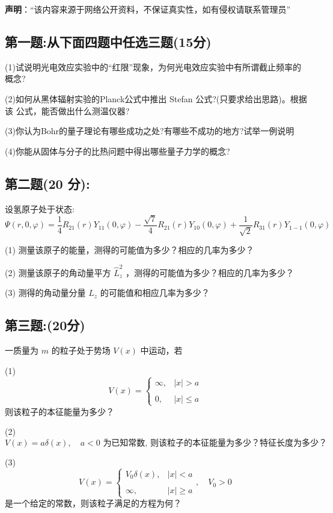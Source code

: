 
\textbf{声明}：“该内容来源于网络公开资料，不保证真实性，如有侵权请联系管理员”

\subsection{第一题:从下面四题中任选三题(15分)}

(1)试说明光电效应实验中的“红限”现象，为何光电效应实验中有所谓截止频率的概念?

(2)如何从黑体辐射实验的Planck公式中推出 Stefan 公式?(只要求给出思路)。根据该
公式，能否做出什么测温仪器?

(3)你认为Bohr的量子理论有哪些成功之处?有哪些不成功的地方?试举一例说明

(4)你能从固体与分子的比热问题中得出哪些量子力学的概念?
\subsection{第二题(20 分):}
设氢原子处于状态:
\[\Psi(r,  0, \varphi) = \frac{1}{4} R_{21}(r) Y_{11}(0, \varphi) - \frac{\sqrt{7}}{4} R_{21}(r) Y_{10}(0, \varphi) + \frac{1}{\sqrt{2}} R_{31}(r) Y_{1-1}(0, \varphi)~\]

(1) 测量该原子的能量，测得的可能值为多少？相应的几率为多少？

(2) 测量该原子的角动量平方 $\hat{L}_z^2$ ，测得的可能值为多少？相应的几率为多少？

(3) 测得的角动量分量 $L_z$ 的可能值和相应几率为多少？
\subsection{第三题:(20分)}
一质量为 $m$ 的粒子处于势场 $V(x)$ 中运动，若

(1) 
\[V(x) = \begin{cases} \infty, & |x| > a \\\\0, & |x| \leq a \end{cases}~\]
则该粒子的本征能量为多少？

(2) 
\[V(x) = a \delta(x), \quad a < 0 \text{ 为已知常数, 则该粒子的本征能量为多少？特征长度为多少？}~\]

(3) 
\[V(x) = \begin{cases} V_0\delta(x), & |x| < a \\\\\infty, & |x| \geq a \end{cases}, \quad V_0 > 0~\]
是一个给定的常数，则该粒子满足的方程为何？

